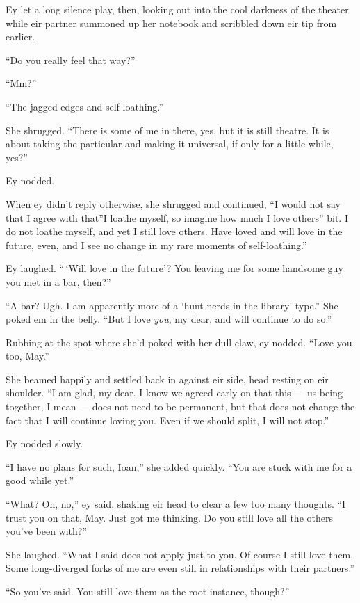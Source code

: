 Ey let a long silence play, then, looking out into the cool darkness of the theater while eir partner summoned up her notebook and scribbled down eir tip from earlier.

``Do you really feel that way?''

``Mm?''

``The jagged edges and self-loathing.''

She shrugged. ``There is some of me in there, yes, but it is still theatre. It is about taking the particular and making it universal, if only for a little while, yes?''

Ey nodded.

When ey didn't reply otherwise, she shrugged and continued, ``I would not say that I agree with that''I loathe myself, so imagine how much I love others'' bit. I do not loathe myself, and yet I still love others. Have loved and will love in the future, even, and I see no change in my rare moments of self-loathing.''

Ey laughed. ``\,`Will love in the future'? You leaving me for some handsome guy you met in a bar, then?''

``A bar? Ugh. I am apparently more of a `hunt nerds in the library' type.'' She poked em in the belly. ``But I love \emph{you}, my dear, and will continue to do so.''

Rubbing at the spot where she'd poked with her dull claw, ey nodded. ``Love you too, May.''

She beamed happily and settled back in against eir side, head resting on eir shoulder. ``I am glad, my dear. I know we agreed early on that this — us being together, I mean — does not need to be permanent, but that does not change the fact that I will continue loving you. Even if we should split, I will not stop.''

Ey nodded slowly.

``I have no plans for such, Ioan,'' she added quickly. ``You are stuck with me for a good while yet.''

``What? Oh, no,'' ey said, shaking eir head to clear a few too many thoughts. ``I trust you on that, May. Just got me thinking. Do you still love all the others you've been with?''

She laughed. ``What I said does not apply just to you. Of course I still love them. Some long-diverged forks of me are even still in relationships with their partners.''

``So you've said. You still love them as the root instance, though?''

